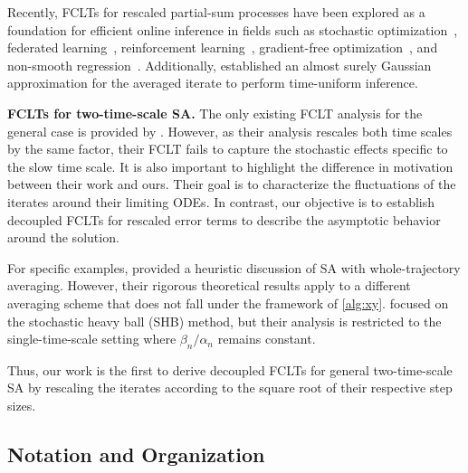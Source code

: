 \documentclass[11pt]{article}
\theoremstyle{plain}
\theoremstyle{definition}
\begin{document}
Recently, FCLTs for rescaled partial-sum processes have been explored as a foundation for efficient online inference in fields such as stochastic optimization~\citep{lee2021fast}, federated learning~\citep{li2022statistical}, reinforcement learning~\citep{li2013statistical, xie2022statistical}, gradient-free optimization~\citep{chen2021online}, and non-smooth regression~\citep{lee2022fast}. Additionally, \cite{xie2024asymptotic} established an almost surely Gaussian approximation for the averaged iterate to perform time-uniform inference.
\vspace{0.1cm}

\textbf{FCLTs for two-time-scale SA.}
The only existing FCLT analysis for the general case is provided by \cite{faizal2023functional}. However, as their analysis rescales both time scales by the same factor, their FCLT fails to capture the stochastic effects specific to the slow time scale. 
It is also important to highlight the difference in motivation between their work and ours. Their goal is to characterize the fluctuations of the iterates around their limiting ODEs. In contrast, our objective is to establish decoupled FCLTs for rescaled error terms to describe the asymptotic behavior around the solution.

For specific examples, \cite{kushner1993stochastic} provided a heuristic discussion of SA with whole-trajectory averaging. However, their rigorous theoretical results apply to a different averaging scheme that does not fall under the framework of \eqref{alg:xy}. \cite{gadat2018stochastic} focused on the stochastic heavy ball (SHB) method, but their analysis is restricted to the single-time-scale setting where $\beta_n / \alpha_n$ remains constant.

Thus, our work is the first to derive decoupled FCLTs for general two-time-scale SA by rescaling the iterates according to the square root of their respective step sizes.


\subsection{Notation and Organization}
\end{document}
